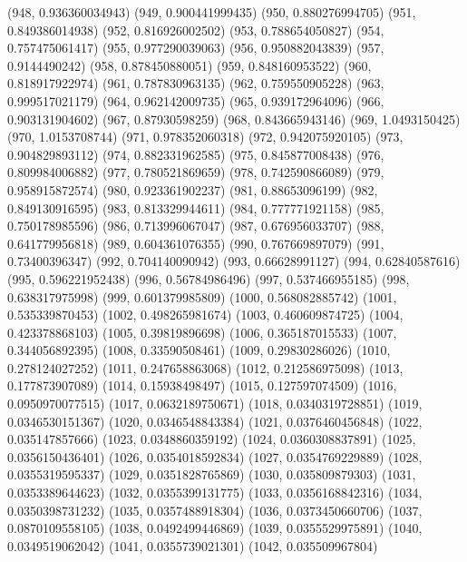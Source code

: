 {					(948, 0.936360034943)
					(949, 0.900441999435)
					(950, 0.880276994705)
					(951, 0.849386014938)
					(952, 0.816926002502)
					(953, 0.788654050827)
					(954, 0.757475061417)
					(955, 0.977290039063)
					(956, 0.950882043839)
					(957, 0.9144490242)
					(958, 0.878450880051)
					(959, 0.848160953522)
					(960, 0.818917922974)
					(961, 0.787830963135)
					(962, 0.759550905228)
					(963, 0.999517021179)
					(964, 0.962142009735)
					(965, 0.939172964096)
					(966, 0.903131904602)
					(967, 0.87930598259)
					(968, 0.843665943146)
					(969, 1.0493150425)
					(970, 1.0153708744)
					(971, 0.978352060318)
					(972, 0.942075920105)
					(973, 0.904829893112)
					(974, 0.882331962585)
					(975, 0.845877008438)
					(976, 0.809984006882)
					(977, 0.780521869659)
					(978, 0.742590866089)
					(979, 0.958915872574)
					(980, 0.923361902237)
					(981, 0.88653096199)
					(982, 0.849130916595)
					(983, 0.813329944611)
					(984, 0.777771921158)
					(985, 0.750178985596)
					(986, 0.713996067047)
					(987, 0.676956033707)
					(988, 0.641779956818)
					(989, 0.604361076355)
					(990, 0.767669897079)
					(991, 0.73400396347)
					(992, 0.704140090942)
					(993, 0.66628991127)
					(994, 0.62840587616)
					(995, 0.596221952438)
					(996, 0.56784986496)
					(997, 0.537466955185)
					(998, 0.638317975998)
					(999, 0.601379985809)
					(1000, 0.568082885742)
					(1001, 0.535339870453)
					(1002, 0.498265981674)
					(1003, 0.460609874725)
					(1004, 0.423378868103)
					(1005, 0.39819896698)
					(1006, 0.365187015533)
					(1007, 0.344056892395)
					(1008, 0.33590508461)
					(1009, 0.29830286026)
					(1010, 0.278124027252)
					(1011, 0.247658863068)
					(1012, 0.212586975098)
					(1013, 0.177873907089)
					(1014, 0.15938498497)
					(1015, 0.127597074509)
					(1016, 0.0950970077515)
					(1017, 0.0632189750671)
					(1018, 0.0340319728851)
					(1019, 0.0346530151367)
					(1020, 0.0346548843384)
					(1021, 0.0376460456848)
					(1022, 0.035147857666)
					(1023, 0.0348860359192)
					(1024, 0.0360308837891)
					(1025, 0.0356150436401)
					(1026, 0.0354018592834)
					(1027, 0.0354769229889)
					(1028, 0.0355319595337)
					(1029, 0.0351828765869)
					(1030, 0.035809879303)
					(1031, 0.0353389644623)
					(1032, 0.0355399131775)
					(1033, 0.0356168842316)
					(1034, 0.0350398731232)
					(1035, 0.0357488918304)
					(1036, 0.0373450660706)
					(1037, 0.0870109558105)
					(1038, 0.0492499446869)
					(1039, 0.0355529975891)
					(1040, 0.0349519062042)
					(1041, 0.0355739021301)
					(1042, 0.035509967804)
}
